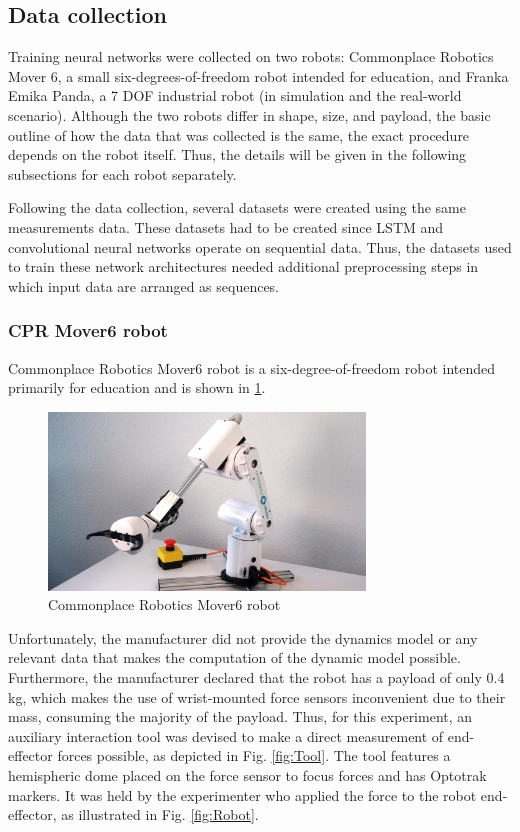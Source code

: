 \subsection{Data collection}

Training neural networks were collected on two robots: Commonplace Robotics Mover 6, a small six-degrees-of-freedom robot intended for education, and Franka Emika Panda, a 7 DOF industrial robot (in simulation and the real-world scenario). Although the two robots differ in shape, size, and payload, the basic outline of how the data that was collected is the same, the exact procedure depends on the robot itself. Thus, the details will be given in the following subsections for each robot separately.

Following the data collection, several datasets were created using the same measurements data. These datasets had to be created since LSTM and convolutional neural networks operate on sequential data. Thus, the datasets used to train these network architectures needed additional preprocessing steps in which input data are arranged as sequences.

\subsubsection{CPR Mover6 robot}

Commonplace Robotics Mover6 robot is a six-degree-of-freedom robot intended primarily for education \cite{Mover6} and is shown in \cref{fig:Mover6}. 

\begin{figure}
    \centering
    \includegraphics[width=0.75\textwidth]{slike/mover6.jpg}
    \caption[Commonplace Robotics Mover6 robot]{Commonplace Robotics Mover6 robot \cite{Mover6}}
    \label{fig:Mover6}
\end{figure}

Unfortunately, the manufacturer did not provide the dynamics model or any relevant data that makes the computation of the dynamic model possible. Furthermore, the manufacturer declared that the robot has a payload of only 0.4 kg, which makes the use of wrist-mounted force sensors inconvenient due to their mass, consuming the majority of the payload. Thus, for this experiment, an auxiliary interaction tool was devised to make a direct measurement of end-effector forces possible, as depicted in Fig. \ref{fig:Tool}. The tool features a hemispheric dome placed on the force sensor to focus forces and has Optotrak markers. It was held by the experimenter who applied the force to the robot end-effector, as illustrated in Fig. \ref{fig:Robot}. 

